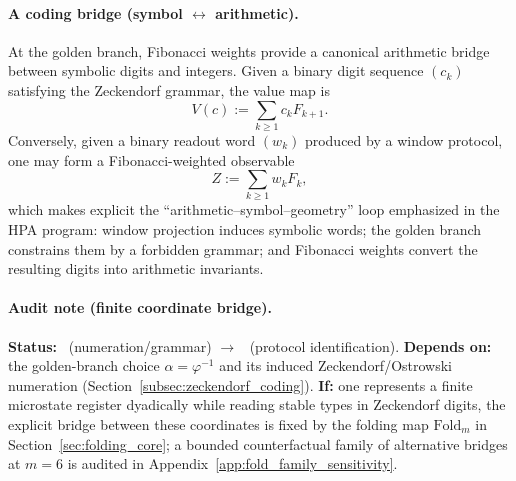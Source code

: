 \paragraph{A coding bridge (symbol \texorpdfstring{$\leftrightarrow$}{<->} arithmetic).}
At the golden branch, Fibonacci weights provide a canonical arithmetic bridge between symbolic digits and integers.
Given a binary digit sequence $(c_k)$ satisfying the Zeckendorf grammar, the value map is
\[
V(c):=\sum_{k\ge 1} c_k F_{k+1}.
\]
Conversely, given a binary readout word $(w_k)$ produced by a window protocol, one may form a Fibonacci-weighted observable
\begin{equation}\label{eq:fib_weighted_readout}
Z:=\sum_{k\ge 1} w_k F_k,
\end{equation}
which makes explicit the ``arithmetic--symbol--geometry'' loop emphasized in the HPA program: window projection induces symbolic words; the golden branch constrains them by a forbidden grammar; and Fibonacci weights convert the resulting digits into arithmetic invariants.

\paragraph{Audit note (finite coordinate bridge).}
\AuditTag \textbf{Status:} \MathTag\ (numeration/grammar) $\to$ \InterfaceTag\ (protocol identification).
\textbf{Depends on:} the golden-branch choice $\alpha=\varphi^{-1}$ and its induced Zeckendorf/Ostrowski numeration (Section~\ref{subsec:zeckendorf_coding}).
\textbf{If:} one represents a finite microstate register dyadically while reading stable types in Zeckendorf digits, the explicit bridge between these coordinates is fixed by the folding map $\mathrm{Fold}_m$ in Section~\ref{sec:folding_core}; a bounded counterfactual family of alternative bridges at $m=6$ is audited in Appendix~\ref{app:fold_family_sensitivity}.

